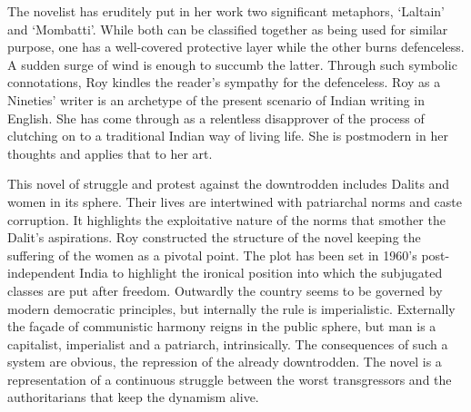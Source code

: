 The novelist has eruditely put in her work two significant metaphors, ‘Laltain’ and ‘Mombatti’. While both can be classified together as being used for similar purpose, one has a well-covered protective layer while the other burns defenceless. A sudden surge of wind is enough to succumb the latter. Through such symbolic connotations, Roy kindles the reader’s sympathy for the defenceless. Roy as a Nineties’ writer is an archetype of the present scenario of Indian writing in English. She has come through as a relentless disapprover of the process of clutching on to a traditional Indian way of living life. She is postmodern in her thoughts and applies that to her art.

This novel of struggle and protest against the downtrodden includes Dalits and women in its sphere. Their lives are intertwined with patriarchal norms and caste corruption. It highlights the exploitative nature of the norms that smother the Dalit’s aspirations. Roy constructed the structure of the novel keeping the suffering of the women as a pivotal point. The plot has been set in 1960’s post-independent India to highlight the ironical position into which the subjugated classes are put after freedom. Outwardly the country seems to be governed by modern democratic principles, but internally the rule is imperialistic. Externally the façade of communistic harmony reigns in the public sphere, but man is a capitalist, imperialist and a patriarch, intrinsically. The consequences of such a system are obvious, the repression of the already downtrodden. The novel is a representation of a continuous struggle between the worst transgressors and the authoritarians that keep the dynamism alive.